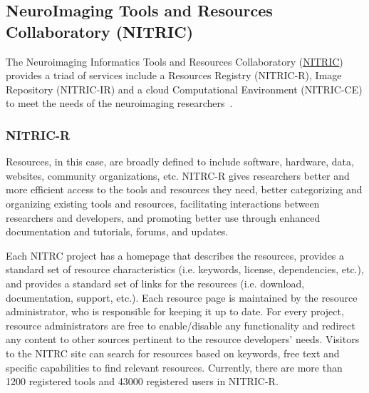 \subsection{NeuroImaging Tools and Resources Collaboratory (NITRIC)} 
The Neuroimaging Informatics Tools and Resources Collaboratory
(\href{www.nitrc.org}{NITRIC}) provides a triad of services include a Resources Registry (NITRIC-R), Image Repository (NITRIC-IR) and a cloud Computational Environment (NITRIC-CE) to meet the needs of the neuroimaging researchers~\cite{kennedy2016nitrc,howToCiteNITRIC_website}.



\subsubsection{NITRIC-R}

Resources, in this case, are broadly deﬁned to include software, hardware, data,
websites, community organizations, etc. NITRC-R gives researchers better and more efficient access to the tools and resources they need, better categorizing and organizing existing tools and resources, facilitating interactions between researchers and developers, and promoting better use through enhanced documentation and tutorials, forums, and updates. 

Each NITRC project has a homepage that describes the resources, provides
a standard set of resource characteristics (i.e. keywords, license,
dependencies, etc.), and provides a standard set of links for the resources
(i.e. download, documentation, support, etc.). Each resource page is
maintained by the resource administrator, who is responsible for
keeping it up to date. For every
project, resource administrators are free to enable/disable any
functionality and redirect any content to other sources pertinent to
the resource developers' needs. Visitors to the NITRC site can search
for resources based on keywords, free text and speciﬁc capabilities to ﬁnd relevant resources. Currently, there are more than 1200 registered tools and 43000 registered users in NITRIC-R. 

